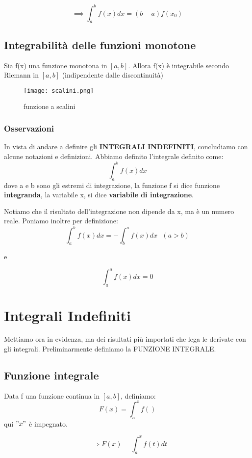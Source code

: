 \documentclass[../main.tex]{subfiles}
\begin{document}
\[\implies \int_a^bf(x)dx = (b-a)f(x_0)\]

\subsection{Integrabilità delle funzioni monotone}
Sia f(x) una funzione monotona in $[a, b]$. Allora f(x) è integrabile secondo
Riemann in $[a, b]$ (indipendente dalle discontinuità) \\
\begin{figure}[ht]
    \centering
    \texttt{[image: scalini.png]}
    \caption{funzione a scalini}
    \label{fig:enter-label}
\end{figure}

\subsubsection{Osservazioni}
In vista di andare a definire gli \textbf{INTEGRALI INDEFINITI}, concludiamo
con alcune notazioni e definizioni. Abbiamo definito l'integrale definito come:
\[\int_a^bf(x)dx\] dove a e b sono gli estremi di integrazione, la funzione f si dice funzione
\textbf{integranda}, la variabile x, si dice \textbf{variabile di
    integrazione}.

Notiamo che il risultato dell'integrazione non dipende da x, ma è un numero
reale. Poniamo inoltre per definizione:\[\int_a^bf(x)dx = - \int_b^af(x)dx \ \
    \ (a > b)\]
\begin{center}
    e
\end{center}

\[\int_a^af(x)dx = 0\]

\section{Integrali Indefiniti}
Mettiamo ora in evidenza, ma dei risultati più importati che lega le derivate
con gli integrali. Preliminarmente definiamo la FUNZIONE INTEGRALE.

\subsection{Funzione integrale}
Data f una funzione continua in $[a, b]$, definiamo:\[F(x) = \int_a^xf( )\]
qui $"x"$ è impegnato.

\[\implies F(x) = \int_a^xf(t)dt\]
\end{document}

